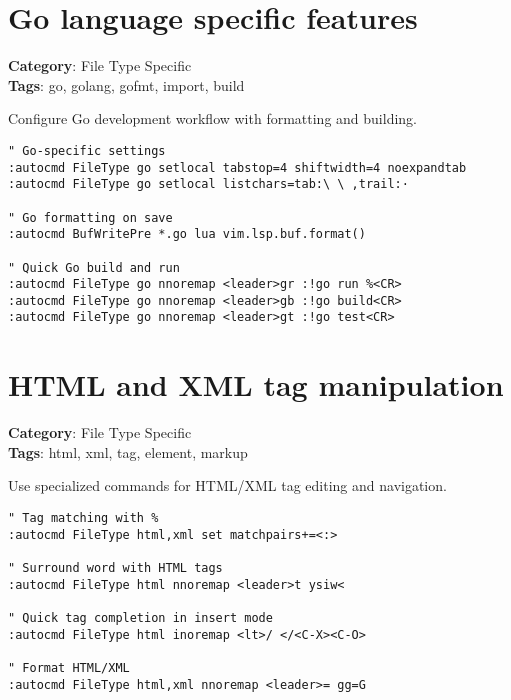 {{{{{{\section{Go language specific features}

\textbf{Category}: File Type Specific\\ \textbf{Tags}: go, golang, gofmt, import, build
\vspace{0.5cm}

Configure Go development workflow with formatting and building.

\begin{Exa*}{}
\begin{Verbatim}[fontsize=\footnotesize, breaklines, breakanywhere]
" Go-specific settings
:autocmd FileType go setlocal tabstop=4 shiftwidth=4 noexpandtab
:autocmd FileType go setlocal listchars=tab:\ \ ,trail:·

" Go formatting on save
:autocmd BufWritePre *.go lua vim.lsp.buf.format()

" Quick Go build and run
:autocmd FileType go nnoremap <leader>gr :!go run %<CR>
:autocmd FileType go nnoremap <leader>gb :!go build<CR>
:autocmd FileType go nnoremap <leader>gt :!go test<CR>
\end{Verbatim}
\end{Exa*}

\section{HTML and XML tag manipulation}

\textbf{Category}: File Type Specific\\ \textbf{Tags}: html, xml, tag, element, markup
\vspace{0.5cm}

Use specialized commands for HTML/XML tag editing and navigation.

\begin{Exa*}{}
\begin{Verbatim}[fontsize=\footnotesize, breaklines, breakanywhere]
" Tag matching with %
:autocmd FileType html,xml set matchpairs+=<:>

" Surround word with HTML tags
:autocmd FileType html nnoremap <leader>t ysiw<

" Quick tag completion in insert mode
:autocmd FileType html inoremap <lt>/ </<C-X><C-O>

" Format HTML/XML
:autocmd FileType html,xml nnoremap <leader>= gg=G
\end{Verbatim}
\end{Exa*}

}}}}}}
